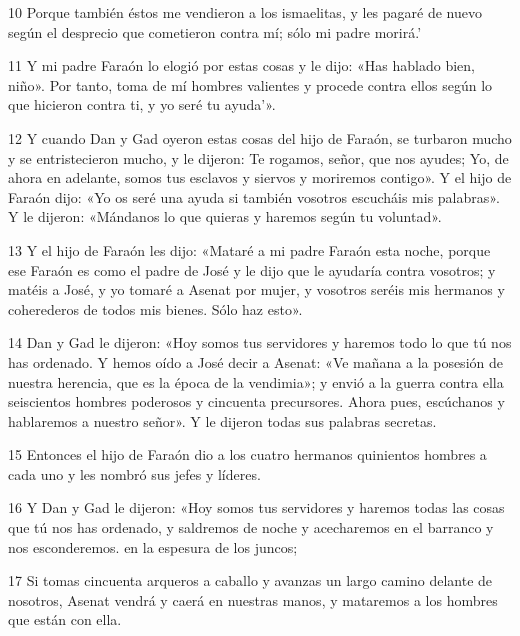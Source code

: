 \par 10 Porque también éstos me vendieron a los ismaelitas, y les pagaré de nuevo según el desprecio que cometieron contra mí; sólo mi padre morirá.'

\par 11 Y mi padre Faraón lo elogió por estas cosas y le dijo: «Has hablado bien, niño». Por tanto, toma de mí hombres valientes y procede contra ellos según lo que hicieron contra ti, y yo seré tu ayuda'».

\par 12 Y cuando Dan y Gad oyeron estas cosas del hijo de Faraón, se turbaron mucho y se entristecieron mucho, y le dijeron: Te rogamos, señor, que nos ayudes; Yo, de ahora en adelante, somos tus esclavos y siervos y moriremos contigo». Y el hijo de Faraón dijo: «Yo os seré una ayuda si también vosotros escucháis mis palabras». Y le dijeron: «Mándanos lo que quieras y haremos según tu voluntad».

\par 13 Y el hijo de Faraón les dijo: «Mataré a mi padre Faraón esta noche, porque ese Faraón es como el padre de José y le dijo que le ayudaría contra vosotros; y matéis a José, y yo tomaré a Asenat por mujer, y vosotros seréis mis hermanos y coherederos de todos mis bienes. Sólo haz esto».

\par 14 Dan y Gad le dijeron: «Hoy somos tus servidores y haremos todo lo que tú nos has ordenado. Y hemos oído a José decir a Asenat: «Ve mañana a la posesión de nuestra herencia, que es la época de la vendimia»; y envió a la guerra contra ella seiscientos hombres poderosos y cincuenta precursores. Ahora pues, escúchanos y hablaremos a nuestro señor». Y le dijeron todas sus palabras secretas.

\par 15 Entonces el hijo de Faraón dio a los cuatro hermanos quinientos hombres a cada uno y les nombró sus jefes y líderes.

\par 16 Y Dan y Gad le dijeron: «Hoy somos tus servidores y haremos todas las cosas que tú nos has ordenado, y saldremos de noche y acecharemos en el barranco y nos esconderemos. en la espesura de los juncos;

\par 17 Si tomas cincuenta arqueros a caballo y avanzas un largo camino delante de nosotros, Asenat vendrá y caerá en nuestras manos, y mataremos a los hombres que están con ella.

